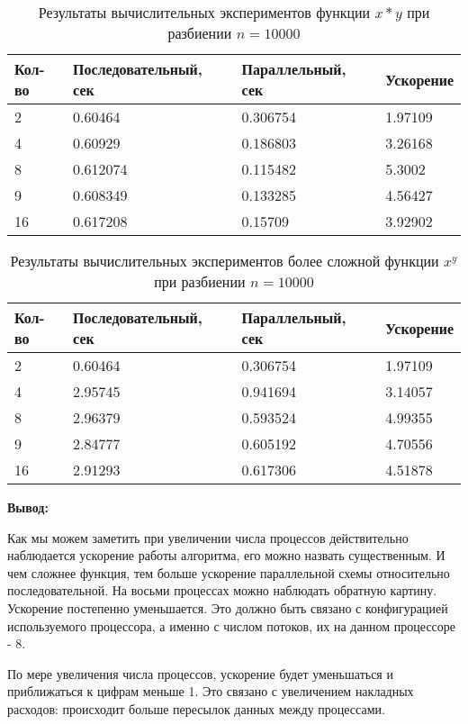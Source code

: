 \documentclass{report}
\begin{document}
\begin{table}[!h]
    \begin{tabular}{ | p{4cm} | p{4cm} | p{4cm} | p{4cm} | }
    \hline
    Кол-во & Последовательный, сек & Параллельный, сек & Ускорение\\ \hline
    2    & 0.60464 & 0.306754 & 1.97109 \\ \hline
    4    & 0.60929 & 0.186803 & 3.26168\\ \hline
    8    & 0.612074 & 0.115482 & 5.3002 \\ \hline
    9    & 0.608349 & 0.133285 & 4.56427 \\ \hline
    16   & 0.617208 & 0.15709 & 3.92902 \\ \hline
    \end{tabular}
    \caption{Результаты вычислительных экспериментов функции $x * y$ при разбиении $n=10000$}
\end{table}
\newpage
\begin{table}[!h]
    \begin{tabular}{ | p{4cm} | p{4cm} | p{4cm} | p{4cm} | }
    \hline
    Кол-во & Последовательный, сек & Параллельный, сек & Ускорение\\ \hline
    2    & 0.60464 & 0.306754 & 1.97109 \\ \hline
    4    & 2.95745 & 0.941694 & 3.14057\\ \hline
    8    & 2.96379 & 0.593524 & 4.99355 \\ \hline
    9    & 2.84777 & 0.605192 & 4.70556 \\ \hline
    16   & 2.91293 & 0.617306 & 4.51878 \\ \hline
    \end{tabular}
    \caption{Результаты вычислительных экспериментов более сложной функции $x^y$ при разбиении $n=10000$}
\end{table}
\par \textbf{Вывод:}
\par Как мы можем заметить при увеличении числа процессов действительно наблюдается ускорение работы алгоритма, его можно назвать существенным. И чем сложнее функция, тем больше ускорение параллельной схемы относительно последовательной. На восьми процессах можно наблюдать обратную картину. Ускорение постепенно уменьшается. Это должно быть связано с конфигурацией используемого процессора, а именно с числом потоков, их на данном процессоре - 8.
\par По мере увеличения числа процессов, ускорение будет уменьшаться и приближаться к цифрам меньше 1. Это связано с увеличением накладных расходов: происходит больше пересылок данных между процессами.
\newpage
\end{document}
